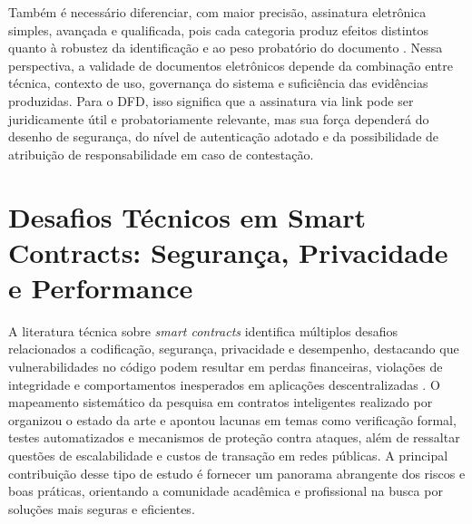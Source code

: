 \documentclass[
    12pt,
    a4paper,
    oneside,
    chapter=TITLE,
    section=TITLE,
    subsection=TITLE,
    subsubsection=TITLE,
    sumario=tradicional,
    english,
    brazil
]{abntex2}
\begin{document}
Também é necessário diferenciar, com maior precisão, assinatura
eletrônica simples, avançada e qualificada, pois cada categoria
produz efeitos distintos quanto à robustez da identificação e ao peso
probatório do documento \cite{brasil2020}. Nessa perspectiva, a
validade de documentos eletrônicos depende da combinação entre técnica,
contexto de uso, governança do sistema e suficiência das evidências
produzidas. Para o DFD, isso
significa que a assinatura via link pode ser juridicamente útil e
probatoriamente relevante, mas sua força dependerá do desenho de
segurança, do nível de autenticação adotado e da possibilidade de
atribuição de responsabilidade em caso de contestação.

\section{Desafios Técnicos em Smart Contracts: Segurança, Privacidade e Performance}
\label{sec:desafios}

A literatura técnica sobre \emph{smart contracts} identifica
múltiplos desafios relacionados a codificação, segurança, privacidade
e desempenho, destacando que vulnerabilidades no código podem
resultar em perdas financeiras, violações de integridade e
comportamentos inesperados em aplicações descentralizadas
\cite{alharby2017}. O mapeamento sistemático da pesquisa em contratos
inteligentes realizado por  organizou o estado da arte e apontou lacunas em temas como
verificação formal, testes automatizados e mecanismos de proteção
contra ataques, além de ressaltar questões de escalabilidade e custos
de transação em redes públicas. A principal contribuição desse tipo
de estudo é fornecer um panorama abrangente dos riscos e boas
práticas, orientando a comunidade acadêmica e profissional na busca
por soluções mais seguras e eficientes.
\end{document}
